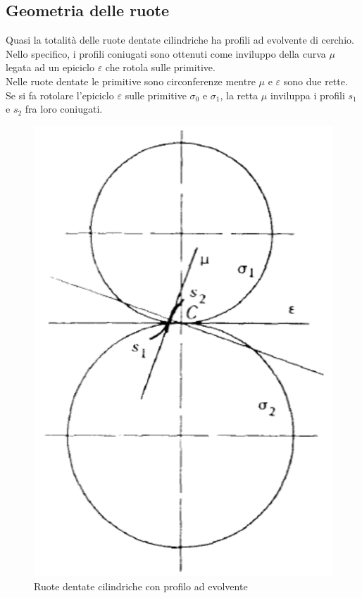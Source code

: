 \subsection{Geometria delle ruote}
Quasi la totalità delle ruote dentate cilindriche ha profili ad evolvente di cerchio. Nello specifico, i profili coniugati sono ottenuti come inviluppo della curva $\mu$ legata ad un epiciclo $\varepsilon$ che rotola sulle primitive.\\
Nelle ruote dentate le primitive sono circonferenze mentre $\mu$ e $\varepsilon$ sono due rette.\\
Se si fa rotolare l’epiciclo $\varepsilon$ sulle primitive $\sigma_0$ e $\sigma_1$, la retta $\mu$ inviluppa i profili $s_1$ e $s_2$ fra loro coniugati.\\
\begin{figure}[h]
    \centering
    \includegraphics[scale=0.35]{Immagini/EvolventeCilindrica.png}
    \caption{Ruote dentate cilindriche con profilo ad evolvente}
    \label{fig:EvolventeCilindriche}
\end{figure}

